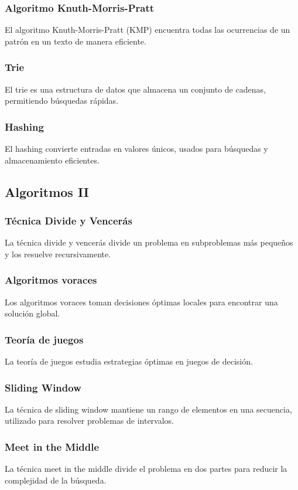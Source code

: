 \subsubsection{Algoritmo Knuth-Morris-Pratt}
El algoritmo Knuth-Morris-Pratt (KMP) encuentra todas las ocurrencias de un patrón en un texto de manera eficiente.
\subsubsection{Trie}
El trie es una estructura de datos que almacena un conjunto de cadenas, permitiendo búsquedas rápidas.
\subsubsection{Hashing}
El hashing convierte entradas en valores únicos, usados para búsquedas y almacenamiento eficientes.

\subsection{Algoritmos II}
\subsubsection{Técnica Divide y Vencerás}
La técnica divide y vencerás divide un problema en subproblemas más pequeños y los resuelve recursivamente.
\subsubsection{Algoritmos voraces}
Los algoritmos voraces toman decisiones óptimas locales para encontrar una solución global.
\subsubsection{Teoría de juegos}
La teoría de juegos estudia estrategias óptimas en juegos de decisión.
\subsubsection{Sliding Window}
La técnica de sliding window mantiene un rango de elementos en una secuencia, utilizado para resolver problemas de intervalos.
\subsubsection{Meet in the Middle}
La técnica meet in the middle divide el problema en dos partes para reducir la complejidad de la búsqueda.

